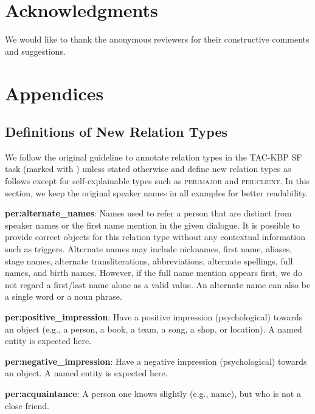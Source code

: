 \documentclass[11pt,a4paper]{article}
\newcommand{\eg}{{e.g.}}
\begin{document}
% 

\section*{Acknowledgments}
We would like to thank the anonymous reviewers for their constructive comments and suggestions.





\clearpage
\newpage

\appendix
\section{Appendices}
\label{sec:appendix}


\subsection{Definitions of New Relation Types}
\label{sec:newreldef}


We follow the original guideline to annotate relation types in the TAC-KBP SF task (marked with ) unless stated otherwise and define new relation types as follows except for self-explainable types such as \textsc{per:major} and \textsc{per:client}. In this section, we keep the original speaker names in all examples for better readability.


\noindent  \textbf{per:alternate\_names}: Names used to refer a person that are distinct from speaker names or the first name mention in the given dialogue. It is possible to provide correct objects for this relation type without any contextual information such as triggers. Alternate names may include nicknames, first name, aliases, stage names, alternate transliterations, abbreviations, alternate spellings, full names, and birth names. However, if the full name mention appears first, we do not regard a first/last name alone as a valid value. An alternate name can also be a single word or a noun phrase.


\noindent  \textbf{per:positive\_impression}: Have a positive impression (psychological) towards an object (\eg, a person, a book, a team, a song, a shop, or location). A named entity is expected here.

\noindent  \textbf{per:negative\_impression}: Have a negative impression (psychological) towards an object. A named entity is expected here.

\noindent  \textbf{per:acquaintance}: A person one knows slightly (\eg, name), but who is not a close friend.
\end{document}
